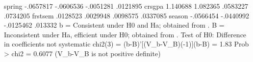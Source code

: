       spring {\VBAR}   -.0657817    -.0606536       -.0051281        .0121895
      crsgpa {\VBAR}    1.140688     1.082365        .0583227        .0734205
     frstsem {\VBAR}    .0128523     .0029948        .0098575        .0337085
      season {\VBAR}   -.0566454    -.0440992       -.0125462         .013332
                          b = Consistent under H0 and Ha; obtained from {}.
           B = Inconsistent under Ha, efficient under H0; obtained from {}.
{\smallskip}
Test of H0: Difference in coefficients not systematic
{\smallskip}
    chi2(3) = (b-B)'[(V_b-V_B){\caret}(-1)](b-B)
            =   1.83
Prob > chi2 = 0.6077
(V_b-V_B is not positive definite)
{\smallskip}
